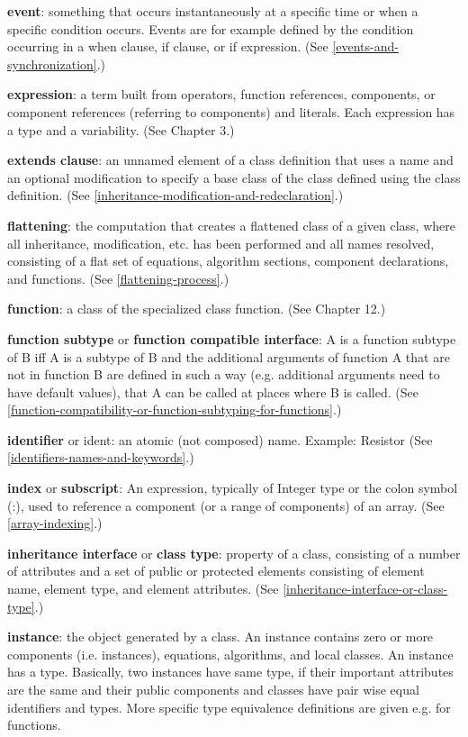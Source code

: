 \documentclass[10pt,a4paper]{report}
\begin{document}
\textbf{event}: something that occurs instantaneously at a specific time
or when a specific condition occurs. Events are for example defined by
the condition occurring in a when clause, if clause, or if expression.
(See \ref{events-and-synchronization}.)

\textbf{expression}: a term built from operators, function references,
components, or component references (referring to components) and
literals. Each expression has a type and a variability. (See Chapter 3.)

\textbf{extends clause}: an unnamed element of a class definition that
uses a name and an optional modification to specify a base class of the
class defined using the class definition. (See \ref{inheritance-modification-and-redeclaration}.)

\textbf{flattening}: the computation that creates a flattened class of a
given class, where all inheritance, modification, etc. has been
performed and all names resolved, consisting of a flat set of equations,
algorithm sections, component declarations, and functions. (See \ref{flattening-process}.)

\textbf{function}: a class of the specialized class function. (See
Chapter 12.)

\textbf{function subtype} or \textbf{function compatible interface}: A
is a function subtype of B iff A is a subtype of B and the additional
arguments of function A that are not in function B are defined in such a
way (e.g. additional arguments need to have default values), that A can
be called at places where B is called. (See \ref{function-compatibility-or-function-subtyping-for-functions}.)

\textbf{identifier} or ident: an atomic (not composed) name. Example:
Resistor (See \ref{identifiers-names-and-keywords}.)

\textbf{index} or \textbf{subscript}: An expression, typically of
Integer type or the colon symbol (:), used to reference a component (or
a range of components) of an array. (See \ref{array-indexing}.)

\textbf{inheritance interface} or \textbf{class type}: property of a
class, consisting of a number of attributes and a set of public or
protected elements consisting of element name, element type, and element
attributes. (See \ref{inheritance-interface-or-class-type}.)

\textbf{instance}: the object generated by a class. An instance contains
zero or more components (i.e. instances), equations, algorithms, and
local classes. An instance has a type. Basically, two instances have
same type, if their important attributes are the same and their public
components and classes have pair wise equal identifiers and types. More
specific type equivalence definitions are given e.g. for functions.
\end{document}
